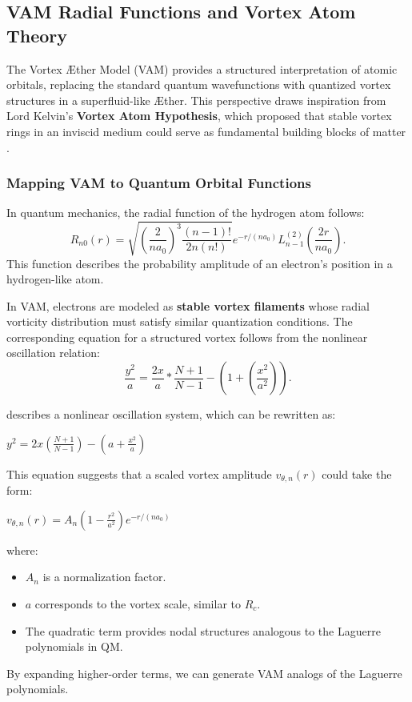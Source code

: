 

\subsection{VAM Radial Functions and Vortex Atom Theory}

The Vortex Æther Model (VAM) provides a structured interpretation of atomic orbitals, replacing the standard quantum wavefunctions with quantized vortex structures in a superfluid-like Æther. This perspective draws inspiration from Lord Kelvin's \textbf{Vortex Atom Hypothesis}, which proposed that stable vortex rings in an inviscid medium could serve as fundamental building blocks of matter \cite{kelvin1867_vortexAtoms}.

\subsubsection{Mapping VAM to Quantum Orbital Functions}

In quantum mechanics, the radial function of the hydrogen atom follows:
\begin{equation*}
    R_{n0}(r) = \sqrt{\left(\frac{2}{n a_0}\right)^3 \frac{(n-1)!}{2n(n!)}} e^{-r / (n a_0)} L_{n-1}^{(2)}\left(\frac{2r}{n a_0}\right).
\end{equation*}
This function describes the probability amplitude of an electron's position in a hydrogen-like atom.

In VAM, electrons are modeled as \textbf{stable vortex filaments} whose radial vorticity distribution must satisfy similar quantization conditions. The corresponding equation for a structured vortex follows from the nonlinear oscillation relation:
\begin{equation*}
    \frac{y^2}{a} = \frac{2 x}{a} * \frac{N + 1}{N - 1} - \left(1 + \left(\frac{x^2}{a^2}\right)\right).
\end{equation*}


describes a nonlinear oscillation system, which can be rewritten as:

$y^2 = 2x \left(\frac{N+1}{N-1}\right) - \left(a + \frac{x^2}{a}\right)$

This equation suggests that a scaled vortex amplitude $v_{\theta, n}(r)$ could take the form:

$v_{\theta, n}(r) = A_n \left(1 - \frac{r^2}{a^2}\right) e^{-r / (n a_0)}$

where:

\begin{itemize}
\item $A_n$ is a normalization factor.
\item $a$ corresponds to the vortex scale, similar to $R_c$.
\item The quadratic term provides nodal structures analogous to the Laguerre polynomials in QM.
\end{itemize}
By expanding higher-order terms, we can generate VAM analogs of the Laguerre polynomials.


